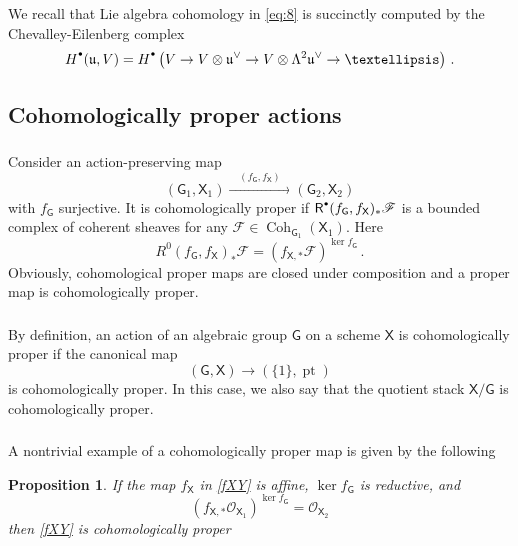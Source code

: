 \documentclass[14pt]{extarticle}
\newcommand{\Rd}{{\mathsf{R}}^{\raisebox{0.5mm}{$\scriptscriptstyle \bullet$}}}
\newcommand{\bG}{\mathsf{G}}
\newcommand{\bX}{\mathsf{X}}
\newcommand{\cF}{\mathscr{F}}
\newcommand{\fu}{\mathfrak{u}}
\newcommand{\cO}{\mathscr{O}}
\newcommand{\Hd}{{H}^{\raisebox{0.5mm}{$\scriptscriptstyle \bullet$}}}
\DeclareMathOperator{\Coh}{Coh}
\DeclareMathOperator{\pt}{pt}
\newtheorem{Proposition}[Lemma]{Proposition}
\theoremstyle{definition}
\begin{document}
\subsubsection{}
We recall that Lie algebra cohomology in \eqref{eq:8} is succinctly
computed by the Chevalley-Eilenberg complex
%
\begin{equation}
\Hd(\fu, V)  = \Hd\left(V \to V \otimes \fu^\vee \to V \otimes
  \Lambda^2 \fu^\vee \to \dots \right) \,.\label{ChE}
\end{equation}
%




\subsection{Cohomologically proper actions}\label{a_proper} 


\subsubsection{}
Consider an action-preserving map
%
\begin{equation}
  (\bG_1, \bX_1)  \xrightarrow{\quad (f_\bG,f_\bX) \quad} 
    (\bG_2, \bX_2) \label{fXY}
\end{equation}
%
with $f_\bG$ surjective. It is cohomologically proper if 
$
\Rd(f_\bG,f_\bX)_* \cF
$
is a bounded complex of coherent sheaves for any $\cF\in
\Coh_{\bG_1}(\bX_1)$.
Here
\[
  R^0(f_\bG,f_\bX)_* \cF  =\left(f_{\bX,*}\cF\right)^{\ker f_\bG} \,. 
\]
Obviously, cohomological proper maps are closed under composition and
a proper map is cohomologically proper.

\subsubsection{} 
By definition, an action of an algebraic group $\bG$ on a scheme $\bX$
is cohomologically proper if the canonical map 
\[
  (\bG, \bX) \to (\{1\},\pt) 
\]
is cohomologically proper. In this case, we also say that the
quotient stack $\bX/\bG$ is cohomologically proper. 



\subsubsection{}

A 
nontrivial example of a cohomologically proper map is given by the
following 



\begin{Proposition}\label{p_proper}
  If the map $f_\bX$ in \eqref{fXY} is affine, $\ker f_\bG$ is reductive, and
  \[
    (f_{\bX,*} \cO_{\bX_1})^{\ker f_\bG}= \cO_{\bX_2} 
  \]
  then \eqref{fXY} is cohomologically proper
\end{Proposition}
\end{document}
